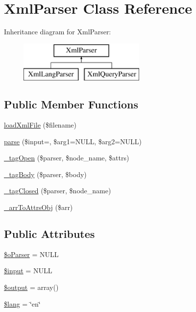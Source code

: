 \hypertarget{classXmlParser}{}\section{Xml\+Parser Class Reference}
\label{classXmlParser}
Inheritance diagram for Xml\+Parser\+:\begin{figure}[H]
\begin{center}
\leavevmode
\includegraphics[height=2.000000cm]{classXmlParser}
\end{center}
\end{figure}
\subsection*{Public Member Functions}
\begin{DoxyCompactItemize}
\item 
\hyperlink{classXmlParser_a3975b17b893e196069963d433046771b}{load\+Xml\+File} (\$filename)
\item 
\hyperlink{classXmlParser_a6d6440dcca586e1733f668678a536739}{parse} (\$input=\textquotesingle{}\textquotesingle{}, \$arg1=N\+U\+LL, \$arg2=N\+U\+LL)
\item 
\hyperlink{classXmlParser_a01facf5db302e49b0b61fb0e1b1fee36}{\+\_\+tag\+Open} (\$parser, \$node\+\_\+name, \$attrs)
\item 
\hyperlink{classXmlParser_a1205550b688631ab1296365904c61a92}{\+\_\+tag\+Body} (\$parser, \$body)
\item 
\hyperlink{classXmlParser_acb524a3ecf27535c9b085a93d714e1c5}{\+\_\+tag\+Closed} (\$parser, \$node\+\_\+name)
\item 
\hyperlink{classXmlParser_ad6c6c76f2e0c9fbd04c071fc30f1a193}{\+\_\+arr\+To\+Attrs\+Obj} (\$arr)
\end{DoxyCompactItemize}
\subsection*{Public Attributes}
\begin{DoxyCompactItemize}
\item 
\hyperlink{classXmlParser_aeee1082b5150f2adb53b16b42ca1b9f5}{\$o\+Parser} = N\+U\+LL
\item 
\hyperlink{classXmlParser_a65903457181cddd5d100685e0d6ba66a}{\$input} = N\+U\+LL
\item 
\hyperlink{classXmlParser_aa4324be74ded61847ce33730c7785389}{\$output} = array()
\item 
\hyperlink{classXmlParser_adbe603248522105c2912dcddeedcd6ab}{\$lang} = \char`\"{}en\char`\"{}
\end{DoxyCompactItemize}


